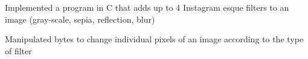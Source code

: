\documentclass[]{deedy-resume-openfont}
\begin{document}
\begin{minipage}[t]{0.66\textwidth}
\begin{tightemize}
\item Implemented a program in C that adds up to 4 Instagram esque filters to an image (gray-scale, sepia, reflection, blur)
\item Manipulated bytes to change individual pixels of an image according to the type of filter
\end{tightemize}
\sectionsep








% 
% 

\end{minipage} 
\end{document}
